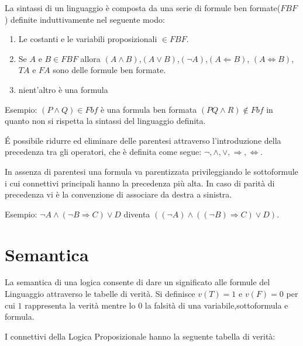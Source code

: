 La sintassi di un linguaggio è composta da una serie di formule ben formate($FBF$) definite
induttivamente nel seguente modo:

\begin{enumerate}
  \item Le costanti e le variabili proposizionali $\in FBF$.
  \item Se $A$ e $B \in FBF$ allora $(A \land B)$,$(A \lor B)$,$(\neg A)$,$(A \Leftarrow B)$,
        $(A \iff B)$,$TA$ e $FA$ sono delle formule ben formate.
  \item nient'altro è una formula
\end{enumerate}

Esempio:\newline
$(P \land Q) \in Fbf$  è una formula ben formata\newline
$(PQ \land R) \not \in Fbf$ in quanto non si rispetta la sintassi del linguaggio definita.\newline


É possibile ridurre ed eliminare delle parentesi attraverso l'introduzione della
precedenza tra gli operatori, che è definita come segue:\newline
$\neg, \land, \lor, \Rightarrow,\iff$.

In assenza di parentesi una formula va parentizzata privileggiando le sottoformule
i cui connettivi principali hanno la precedenza più alta.\newline
In caso di parità di precedenza vi è la convenzione di associare da destra a sinistra.

Esempio:\newline
$\neg A \land (\neg B \Rightarrow C) \lor D$ diventa
$((\neg A) \land ((\neg B) \Rightarrow C) \lor D)$.

\section{Semantica}
La semantica di una logica consente di dare un significato alle formule del Linguaggio
attraverso le tabelle di verità.\newline
Si definisce $v(T) = 1$ e $v(F) = 0$ per cui $1$ rappresenta la verità mentre lo $0$
la falsità di una variabile,sottoformula e formula.

I connettivi della Logica Proposizionale hanno la seguente tabella di verità:\newline

